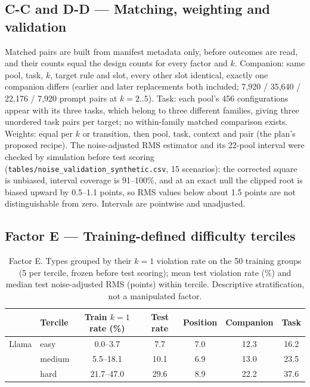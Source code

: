 \documentclass{article}
\begin{document}
\subsection*{C-C and D-D --- Matching, weighting and validation}
Matched pairs are built from manifest metadata only, before outcomes are read, and their counts equal the design counts for every factor and $k$. Companion: same pool, task, $k$, target rule and slot, every other slot identical, exactly one companion differs (earlier and later replacements both included; 7,920 / 35,640 / 22,176 / 7,920 prompt pairs at $k=2..5$). Task: each pool's 456 configurations appear with its three tasks, which belong to three different families, giving three unordered task pairs per target; no within-family matched comparison exists. Weights: equal per $k$ or transition, then pool, task, context and pair (the plan's proposed recipe). The noise-adjusted RMS estimator and its 22-pool interval were checked by simulation before test scoring (\texttt{tables/noise\_validation\_synthetic.csv}, 15 scenarios): the corrected square is unbiased, interval coverage is 91--100\%, and at an exact null the clipped root is biased upward by 0.5--1.1 points, so RMS values below about 1.5 points are not distinguishable from zero. Intervals are pointwise and unadjusted.

\subsection*{Factor E --- Training-defined difficulty terciles}
\begin{table}[h]
\centering\scriptsize
\caption{Factor E. Types grouped by their $k=1$ violation rate on the 50 training groups (5 per tercile, frozen before test scoring); mean test violation rate (\%) and median test noise-adjusted RMS (points) within tercile. Descriptive stratification, not a manipulated factor.}
\label{tab:E}
\begin{tabular}{llccccc}
\toprule
 & Tercile & Train $k{=}1$ rate (\%) & Test rate & Position & Companion & Task \\
\midrule
Llama & easy & 0.0--3.7 & 7.7 & 7.0 & 12.3 & 16.2 \\
 & medium & 5.5--18.1 & 10.1 & 6.9 & 13.0 & 23.5 \\
 & hard & 21.7--47.0 & 29.6 & 8.9 & 22.2 & 37.6 \\
\bottomrule
\end{tabular}
\end{table}


\clearpage
\end{document}

